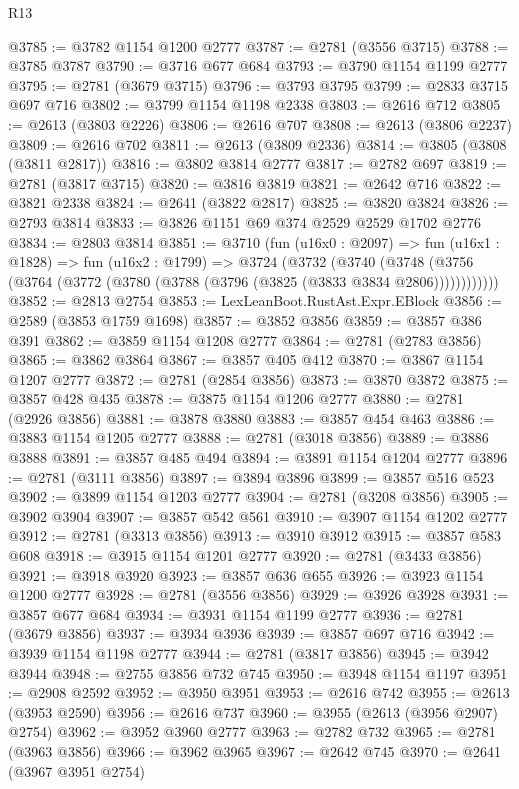 \begin{lexlean}{R13}
\begin{coremodule}
@3785 := @3782 @1154 @1200 @2777
@3787 := @2781 (@3556 @3715)
@3788 := @3785 @3787
@3790 := @3716 @677 @684
@3793 := @3790 @1154 @1199 @2777
@3795 := @2781 (@3679 @3715)
@3796 := @3793 @3795
@3799 := @2833 @3715 @697 @716
@3802 := @3799 @1154 @1198 @2338
@3803 := @2616 @712
@3805 := @2613 (@3803 @2226)
@3806 := @2616 @707
@3808 := @2613 (@3806 @2237)
@3809 := @2616 @702
@3811 := @2613 (@3809 @2336)
@3814 := @3805 (@3808 (@3811 @2817))
@3816 := @3802 @3814 @2777
@3817 := @2782 @697
@3819 := @2781 (@3817 @3715)
@3820 := @3816 @3819
@3821 := @2642 @716
@3822 := @3821 @2338
@3824 := @2641 (@3822 @2817)
@3825 := @3820 @3824
@3826 := @2793 @3814
@3833 := @3826 @1151 @69 @374 @2529 @2529 @1702 @2776
@3834 := @2803 @3814
@3851 := @3710
    (fun (u16x0 : @2097) =>
    fun (u16x1 : @1828) =>
    fun (u16x2 : @1799) =>
    @3724
      (@3732
        (@3740
          (@3748 (@3756 (@3764 (@3772 (@3780 (@3788 (@3796 (@3825 (@3833 @3834 @2806))))))))))))
@3852 := @2813 @2754
@3853 := LexLeanBoot.RustAst.Expr.EBlock
@3856 := @2589 (@3853 @1759 @1698)
@3857 := @3852 @3856
@3859 := @3857 @386 @391
@3862 := @3859 @1154 @1208 @2777
@3864 := @2781 (@2783 @3856)
@3865 := @3862 @3864
@3867 := @3857 @405 @412
@3870 := @3867 @1154 @1207 @2777
@3872 := @2781 (@2854 @3856)
@3873 := @3870 @3872
@3875 := @3857 @428 @435
@3878 := @3875 @1154 @1206 @2777
@3880 := @2781 (@2926 @3856)
@3881 := @3878 @3880
@3883 := @3857 @454 @463
@3886 := @3883 @1154 @1205 @2777
@3888 := @2781 (@3018 @3856)
@3889 := @3886 @3888
@3891 := @3857 @485 @494
@3894 := @3891 @1154 @1204 @2777
@3896 := @2781 (@3111 @3856)
@3897 := @3894 @3896
@3899 := @3857 @516 @523
@3902 := @3899 @1154 @1203 @2777
@3904 := @2781 (@3208 @3856)
@3905 := @3902 @3904
@3907 := @3857 @542 @561
@3910 := @3907 @1154 @1202 @2777
@3912 := @2781 (@3313 @3856)
@3913 := @3910 @3912
@3915 := @3857 @583 @608
@3918 := @3915 @1154 @1201 @2777
@3920 := @2781 (@3433 @3856)
@3921 := @3918 @3920
@3923 := @3857 @636 @655
@3926 := @3923 @1154 @1200 @2777
@3928 := @2781 (@3556 @3856)
@3929 := @3926 @3928
@3931 := @3857 @677 @684
@3934 := @3931 @1154 @1199 @2777
@3936 := @2781 (@3679 @3856)
@3937 := @3934 @3936
@3939 := @3857 @697 @716
@3942 := @3939 @1154 @1198 @2777
@3944 := @2781 (@3817 @3856)
@3945 := @3942 @3944
@3948 := @2755 @3856 @732 @745
@3950 := @3948 @1154 @1197
@3951 := @2908 @2592
@3952 := @3950 @3951
@3953 := @2616 @742
@3955 := @2613 (@3953 @2590)
@3956 := @2616 @737
@3960 := @3955 (@2613 (@3956 @2907) @2754)
@3962 := @3952 @3960 @2777
@3963 := @2782 @732
@3965 := @2781 (@3963 @3856)
@3966 := @3962 @3965
@3967 := @2642 @745
@3970 := @2641 (@3967 @3951 @2754)

\end{coremodule}
\end{lexlean}

